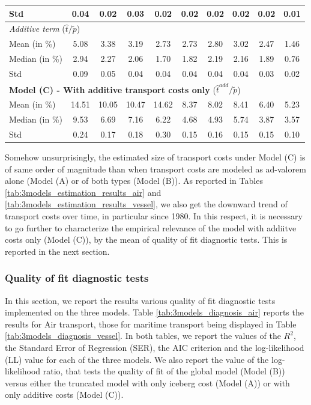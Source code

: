 \documentclass[11pt,twoside, authoryear]{elsarticle}
\begin{document}
\begin{table}[htbp]
{\begin{tabular}{l|c c c c c c c c c}
    Std & 0.04  & 0.02  & 0.03  & 0.02  & 0.02  & 0.02  & 0.02  & 0.02  & 0.01 \\ \hline
       \multicolumn{10}{l}{\textit{Additive term} ($\widehat{t}/\widetilde{p}$)}  \\ \hline
    Mean (in \%)  & 5.08  & 3.38  & 3.19  & 2.73  & 2.73  & 2.80  & 3.02  & 2.47  & 1.46 \\
    Median (in \%) & 2.94  & 2.27  & 2.06  & 1.70  & 1.82  & 2.19  & 2.16  & 1.89  & 0.76 \\
    Std & 0.09  & 0.05  & 0.04  & 0.04  & 0.04  & 0.04  & 0.04  & 0.03  & 0.02 \\ \hline
    \multicolumn{10}{l}{\textbf{Model (C) - With additive transport costs only} ($\widehat{t}^{add}/\widetilde{p}$)} \\ \hline
    Mean (in \%) & 14.51 & 10.05 & 10.47 & 14.62 & 8.37  & 8.02  & 8.41  & 6.40  & 5.23 \\
    Median (in \%)& 9.53  & 6.69  & 7.16  & 6.22  & 4.68  & 4.93  & 5.74  & 3.87  & 3.57 \\
    Std & 0.24  & 0.17  & 0.18  & 0.30  & 0.15  & 0.16  & 0.15  & 0.15  & 0.10 \\ \hline \hline
   \end{tabular}%
   }
\end{table}%

Somehow unsurprisingly, the estimated size of transport costs under Model (C) is of same order of magnitude than when transport costs are modeled as ad-valorem alone (Model (A) or of both types (Model (B)). As reported in Tables \ref{tab:3models_estimation_results_air} and \ref{tab:3models_estimation_results_vessel}, we also get the downward trend of transport costs over time, in particular since 1980. In this respect, it is necessary to go further to characterize the empirical relevance of the model with addiitve costs only (Model (C)), by the mean of quality of fit diagnostic tests. This is reported in the next section.


\subsubsection{Quality of fit diagnostic tests}

In this section, we report the results various quality of fit diagnostic tests implemented on the three models. Table \ref{tab:3models_diagnosis_air} reports the results for Air transport, those for maritime transport being displayed in Table \ref{tab:3models_diagnosis_vessel}. In both tables, we report the values of the $R^2$, the Standard Error of Regression (SER), the AIC criterion  and the log-likelihood (LL) value for each of the three models. We also report the value of the log-likelihood ratio, that tests the quality of fit of the global model (Model (B)) versus either the truncated model with only iceberg cost (Model (A)) or with only additive costs (Model (C)).
\end{document}
